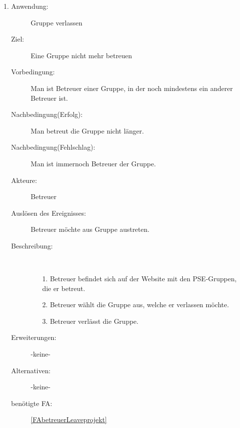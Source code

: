 \documentclass[parskip=full]{scrartcl}
\newcommand{\swtLabel}[1]{\textbf{/#1\arabic*0/}}
\begin{document}
\begin{enumerate} [label=\swtLabel{B}]
  
  \item \label{UCbetreuerLeaveProjekt}
	\begin{description}
  		\item[Anwendung:] Gruppe verlassen
  		\item[Ziel:] Eine Gruppe nicht mehr betreuen
  		\item[Vorbedingung:] Man ist Betreuer einer Gruppe, in der noch mindestens
  		ein anderer Betreuer ist.
  		\item[Nachbedingung(Erfolg):] Man betreut die Gruppe nicht länger.
  		\item[Nachbedingung(Fehlschlag):] Man ist immernoch Betreuer der Gruppe.
  		\item[Akteure:] Betreuer
  		\item[Auslösen des Ereignisses:] Betreuer möchte aus Gruppe austreten.
  		\item[Beschreibung:]~
  	\begin{enumerate} 
  	  \item[1.] Betreuer befindet sich auf der Website mit den \gls{PSE}-Gruppen, die
  	  er betreut.
  	  \item[2.] Betreuer wählt die Gruppe aus, welche er verlassen möchte.
  	  \item[3.] Betreuer verlässt die Gruppe.
  	\end{enumerate}
  	\item[Erweiterungen:] -keine-
  	\item[Alternativen:] -keine-
  	\item[benötigte FA:] \ref{FAbetreuerLeaveprojekt}
  \end{description}
   

\end{enumerate}
\end{document}
